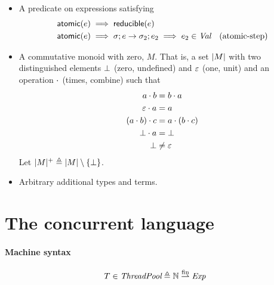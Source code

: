 \begin{itemize}
\item A predicate  on expressions satisfying
  \begin{align*}
   &\textsf{atomic}(e) \implies \textsf{reducible}(e) &\\
   &\textsf{atomic}(e) \implies {\sigma};{e} \rightarrow {\sigma_2};{e_2} \implies e_2 \in \textit{Val} &\mbox{(atomic-step)}
  \end{align*}


\item A commutative monoid with zero, $M$.
That is, a set $|M|$ with two distinguished elements $\bot$ (zero, undefined) and $\mathord{\varepsilon}$ (one, unit) and an operation $\mathbin{\cdot}$ (times, combine) such that
\begin{align*}
 a \mathbin{\cdot} b &= b \mathbin{\cdot} a \\
 \mathord{\varepsilon} \mathbin{\cdot} a &= a \\
 (a \mathbin{\cdot} b) \mathbin{\cdot} c &= a \mathbin{\cdot} (b \mathbin{\cdot} c) \\
 \bot \mathbin{\cdot} a &= \bot \\
 \bot &\neq \mathord{\varepsilon}
\end{align*}
Let $|M|^{+} \triangleq |M| \setminus \{\bot\}$.

\item Arbitrary additional types and terms.
\end{itemize}

\section{The concurrent language}

\paragraph{Machine syntax}
\[
	T \in \textit{ThreadPool} \triangleq \mathbb{N} \stackrel{\textrm{fin}}{\rightharpoonup} \textit{Exp}
\]

 {\cfg{\state}{\tpool} \step
  }

